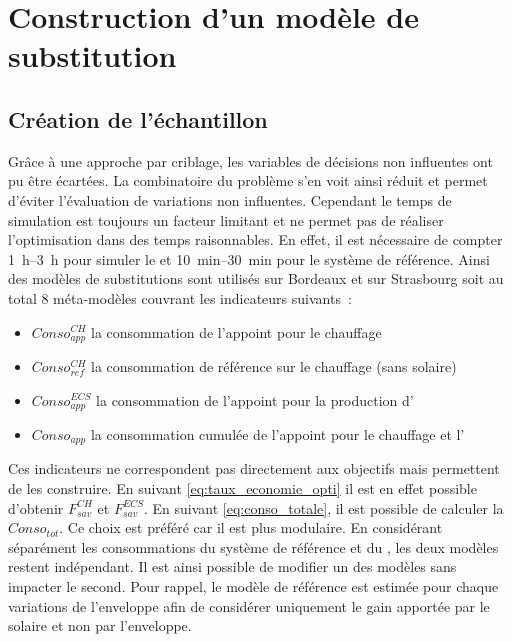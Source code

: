 \section{Construction d’un modèle de substitution} %
\label{sub:construction_d_un_modele_de_substitution}
\subsection{Création de l’échantillon} %
\label{sub:creation_de_l_echantillon}
Grâce à une approche par criblage, les variables de décisions non influentes ont pu être
écartées. La combinatoire du problème s’en voit ainsi réduit et permet d’éviter
l’évaluation de variations non influentes.
Cependant le temps de simulation est toujours un facteur limitant et ne permet pas
de réaliser l’optimisation dans des temps raisonnables. En effet, il est nécessaire de
compter \SIrange{1}{3}{h} pour simuler le  et \SIrange{10}{30}{min} pour
le système de référence.
Ainsi des modèles de substitutions sont utilisés sur Bordeaux et sur Strasbourg
soit au total $8$ méta-modèles couvrant les indicateurs suivants~:
\begin{itemize}
  \item $Conso_{app}^{CH}$ la consommation de l’appoint pour le chauffage
  \item $Conso_{ref}^{CH}$ la consommation de référence sur le chauffage (sans solaire)
  \item $Conso_{app}^{ECS}$ la consommation de l’appoint pour la production d’
  \item $Conso_{app}$ la consommation cumulée de l’appoint pour le chauffage et l’
\end{itemize}

Ces indicateurs ne correspondent pas directement aux objectifs mais permettent de les construire.
En suivant \eqref{eq:taux_economie_opti} il est en effet possible d’obtenir $F_{sav}^{CH}$ et $F_{sav}^{ECS}$.
En suivant \eqref{eq:conso_totale}, il est possible de calculer la $Conso_{tot}$.
Ce choix est préféré car il est plus modulaire. En considérant séparément les consommations
du système de référence et du , les deux modèles restent indépendant. Il est
ainsi possible de modifier un des modèles sans impacter le second. Pour rappel, le
modèle de référence est estimée pour chaque variations de l’enveloppe afin de considérer
uniquement le gain apportée par le solaire et non par l’enveloppe.


